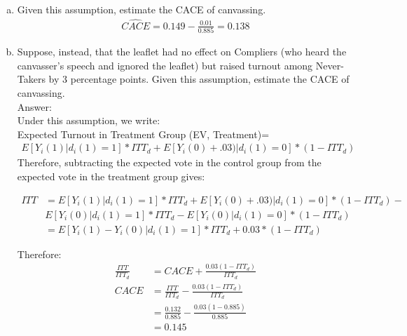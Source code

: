 \documentclass[11pt,notitlepage]{article}\usepackage[]{graphicx}\usepackage[]{color}
\begin{document}
\begin{enumerate}[a)]
\item Given this assumption, estimate the CACE of canvassing.
\begin{align*}
\widehat{CACE} = 0.149 - \frac{0.01}{0.885} = 0.138
\end{align*}
\item Suppose, instead, that the leaflet had no effect on Compliers (who heard the canvasser's speech and ignored the leaflet) but raised turnout among Never-Takers by 3 percentage points. Given this assumption, estimate the CACE of canvassing.\\
Answer:\\
Under this assumption, we write:\\
Expected Turnout in Treatment Group (EV, Treatment)=
\begin{align*}
E[Y_i(1)|d_i(1)=1]* ITT_d + E[Y_i(0)+.03)|d_i(1)=0]*(1-ITT_d)
\end{align*}
Therefore, subtracting the expected vote in the control group from the expected vote in the treatment group gives:

\begin{align*}
ITT &= E[Y_i(1)|d_i(1)=1]* ITT_d + E[Y_i(0)+.03)|d_i(1)=0]*(1-ITT_d) - \\
& E[Y_i(0)|d_i(1)=1]*ITT_d - E[Y_i(0)|d_i(1)=0]*(1-ITT_d) \\
&= E[Y_i(1) - Y_i(0)|d_i(1)=1]*ITT_d + 0.03*(1-ITT_d)
\end{align*}

Therefore:
\begin{align*}
\frac{ITT}{ITT_d} &= CACE + \frac{0.03(1-ITT_d)}{ITT_d}\\
CACE &= \frac{ITT}{ITT_d} - \frac{0.03(1-ITT_d)}{ITT_d}\\
&= \frac{0.132}{0.885} - \frac{0.03(1-0.885)}{0.885}\\
&= 0.145
\end{align*}



\end{enumerate}
\end{document}
